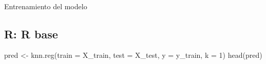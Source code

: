 \documentclass[
  letterpaper,
  DIV=11,
  numbers=noendperiod]{scrartcl}
\makeatletter
\let\oldparagraph\paragraph
\renewcommand{\paragraph}{
    \@ifstar
      \xxxParagraphStar
      \xxxParagraphNoStar
  }
\newcommand{\xxxParagraphStar}[1]{\oldparagraph*{#1}\mbox{}}
\newcommand{\xxxParagraphNoStar}[1]{\oldparagraph{#1}\mbox{}}
\newenvironment{Shaded}{\begin{snugshade}}{\end{snugshade}}
\newcommand{\AttributeTok}[1]{\textcolor[rgb]{0.40,0.45,0.13}{#1}}
\newcommand{\DecValTok}[1]{\textcolor[rgb]{0.68,0.00,0.00}{#1}}
\newcommand{\FunctionTok}[1]{\textcolor[rgb]{0.28,0.35,0.67}{#1}}
\newcommand{\NormalTok}[1]{\textcolor[rgb]{0.00,0.23,0.31}{#1}}
\newcommand{\OtherTok}[1]{\textcolor[rgb]{0.00,0.23,0.31}{#1}}
\makeatother
\begin{document}
\paragraph{Entrenamiento del modelo}\label{entrenamiento-del-modelo-1}

\subsection{R: R base}

\begin{Shaded}
\begin{Highlighting}[]
\NormalTok{pred }\OtherTok{\textless{}{-}} \FunctionTok{knn.reg}\NormalTok{(}\AttributeTok{train =}\NormalTok{ X\_train, }\AttributeTok{test =}\NormalTok{ X\_test, }\AttributeTok{y =}\NormalTok{ y\_train, }\AttributeTok{k =} \DecValTok{1}\NormalTok{)}
\FunctionTok{head}\NormalTok{(pred)}
\end{Highlighting}
\end{Shaded}
\end{document}
